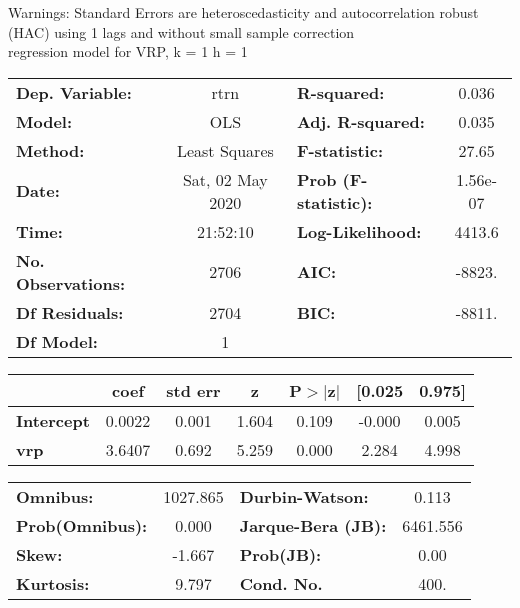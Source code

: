 Warnings: \newline
 [1] Standard Errors are heteroscedasticity and autocorrelation robust (HAC) using 1 lags and without small sample correction\\ 

regression model for VRP, k = 1 h = 1\begin{center}
\begin{tabular}{lclc}
\toprule
\textbf{Dep. Variable:}    &       rtrn       & \textbf{  R-squared:         } &     0.036   \\
\textbf{Model:}            &       OLS        & \textbf{  Adj. R-squared:    } &     0.035   \\
\textbf{Method:}           &  Least Squares   & \textbf{  F-statistic:       } &     27.65   \\
\textbf{Date:}             & Sat, 02 May 2020 & \textbf{  Prob (F-statistic):} &  1.56e-07   \\
\textbf{Time:}             &     21:52:10     & \textbf{  Log-Likelihood:    } &    4413.6   \\
\textbf{No. Observations:} &        2706      & \textbf{  AIC:               } &    -8823.   \\
\textbf{Df Residuals:}     &        2704      & \textbf{  BIC:               } &    -8811.   \\
\textbf{Df Model:}         &           1      & \textbf{                     } &             \\
\bottomrule
\end{tabular}
\begin{tabular}{lcccccc}
                   & \textbf{coef} & \textbf{std err} & \textbf{z} & \textbf{P$> |$z$|$} & \textbf{[0.025} & \textbf{0.975]}  \\
\midrule
\textbf{Intercept} &       0.0022  &        0.001     &     1.604  &         0.109        &       -0.000    &        0.005     \\
\textbf{vrp}       &       3.6407  &        0.692     &     5.259  &         0.000        &        2.284    &        4.998     \\
\bottomrule
\end{tabular}
\begin{tabular}{lclc}
\textbf{Omnibus:}       & 1027.865 & \textbf{  Durbin-Watson:     } &    0.113  \\
\textbf{Prob(Omnibus):} &   0.000  & \textbf{  Jarque-Bera (JB):  } & 6461.556  \\
\textbf{Skew:}          &  -1.667  & \textbf{  Prob(JB):          } &     0.00  \\
\textbf{Kurtosis:}      &   9.797  & \textbf{  Cond. No.          } &     400.  \\
\bottomrule
\end{tabular}
\end{center}

